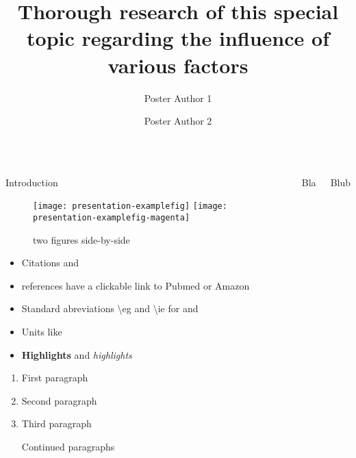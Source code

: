 \documentclass[english,xcolor=table,t
]{beamer}
\title{Thorough research of this special topic regarding the influence of
various factors}
\author{Poster Author 1 \and Poster Author 2}
\institute{Institute, Dept., University}
\begin{document}
\begin{frame}

\begin{columns}


\begin{block}{Introduction}


\begin{figure}
\texttt{[image: presentation-examplefig]}
\texttt{[image: presentation-examplefig-magenta]}
\caption{two figures side-by-side}
\end{figure}


\begin{itemize}
\itemsep1pt\parskip0pt
\item
  Citations \autocite{Macherey2006} and \textcite{Macherey2006}
\item
  references have a clickable link to Pubmed or Amazon
\item
  Standard abreviations \textbackslash{}eg and \textbackslash{}ie for
  \eg and \ie
\item
  Units like 
\item
  \textbf{Highlights} and \emph{highlights}
\end{itemize}


\begin{enumerate}
\def\labelenumi{\arabic{enumi}.}
\item
  First paragraph
\item
  Second paragraph
\item
  Third paragraph

  Continued paragraphs
\end{enumerate}

\end{block}

\begin{block}{Bla}

\lipsum[1]

\end{block}

\begin{block}{Blub}

\begin{columns}



\end{columns}
\end{block}
\end{columns}
\end{frame}
\end{document}
